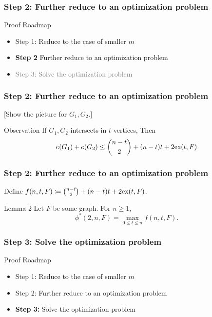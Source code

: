 \documentclass{beamer}
\newcommand*{\ex}{\textnormal{ex}}
\begin{document}
\begin{frame}
  \frametitle{Step 2: Further reduce to an optimization problem}

  Proof Roadmap

  \begin{itemize}
    \item Step 1: Reduce to the case of smaller $m$
    \item \textbf{Step 2} Further reduce to an optimization problem
    \item \textcolor{gray}{Step 3: Solve the optimization problem}
  \end{itemize}
\end{frame}

\begin{frame}
  \frametitle{Step 2: Further reduce to an optimization problem}

  [Show the picture for $G_1, G_2$.]

  \pause

  \begin{block}{Observation}
    If $G_1, G_2$ intersects in $t$ vertices, Then
    \[
      e(G_1) + e(G_2) \leq \binom{n - t}{2} + (n - t)t + 2\ex(t, F)
    \]
  \end{block}
\end{frame}

\begin{frame}
  \frametitle{Step 2: Further reduce to an optimization problem}

  Define $f(n, t, F) \coloneq \binom{n - t}{2} + (n - t)t + 2\ex(t, F)$.

  \begin{block}{Lemma 2}
    Let $F$ be some graph. For $n \geq 1$,
    \[
      \phi^*(2, n, F) = \max_{0 \leq t \leq n} f(n, t, F).
    \]
  \end{block}
\end{frame}

\begin{frame}
  \frametitle{Step 3: Solve the optimization problem}

  Proof Roadmap

  \begin{itemize}
    \item Step 1: Reduce to the case of smaller $m$
    \item Step 2: Further reduce to an optimization problem
    \item \textbf{Step 3:} Solve the optimization problem
  \end{itemize}
\end{frame}
\end{document}
